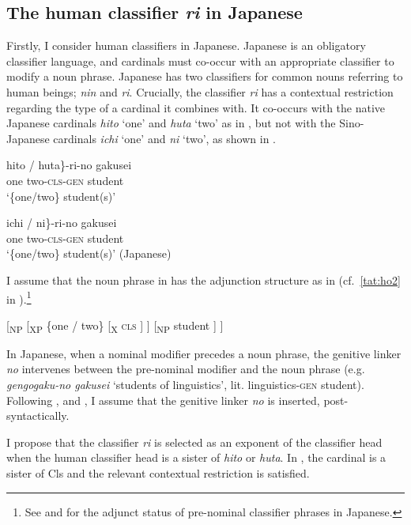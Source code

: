 \documentclass[output=paper]{langscibook}
\begin{document}
\subsection{The human classifier \textit{ri} in Japanese}\label{tat:sec:add.ja}\largerpage
Firstly, I consider human classifiers in Japanese. Japanese is an obligatory classifier language, and cardinals must co-occur with an appropriate classifier to modify a noun phrase. Japanese has two classifiers for common nouns referring to human beings; \textit{nin} and \textit{ri}. Crucially, the classifier \textit{ri} has a contextual restriction regarding the type of a cardinal it combines with. It co-occurs with the native Japanese cardinals \textit{hito} `one' and \textit{huta} `two' as in , but not with the Sino-Japanese cardinals \textit{ichi} `one' and \textit{ni} `two', as shown in .


\ea
\ea\label{tat:ex:jap.cls.selection.1.2}
\gll\minsp{\{} hito / huta\textnormal{\}}-ri-no gakusei\\  
      {} one {} two-\textsc{cls-gen} student\\ 
\glt `\{one/two\} student(s)'

\ex
\gll \minsp{\{*} ichi / \minsp{*} ni\textnormal{\}}-ri-no gakusei\\  
      {} one {} {} two-\textsc{cls-gen} student\\ 
\glt `\{one/two\} student(s)' \hfill(Japanese)
\z\z

\noindent I assume that the noun phrase in  has the adjunction structure as in  (cf.~\ref{tat:ho2} in ).\footnote{See \citet{SaitoMurasugi1990} and \citet{HuangOchi2014} for the adjunct status of pre-nominal classifier phrases in Japanese.}

\ea\label{tat:jap.cls}
[\textsubscript{NP} [\textsubscript{XP} \{one / two\} [\textsubscript{X} \textsc{cls} ] ] [\textsubscript{NP} student ] ]
\z

\noindent In Japanese, when a nominal modifier precedes a noun phrase, the genitive linker \textit{no} intervenes between the pre-nominal modifier and the noun phrase (e.g. \textit{gen\-go\-gaku-no gakusei} `students of linguistics', lit. linguistics-\textsc{gen} student). Following \citet{KitagawaRoss1982}, and \citet{Watanabe2006}, I assume that the genitive linker \textit{no} is inserted, post-syntactically. 

I propose that the classifier \textit{ri} is selected as an exponent of the classifier head when the human classifier head is a sister of \textit{hito} or \textit{huta}. In , the cardinal is a sister of Cls and the relevant contextual restriction is satisfied.
\end{document}
